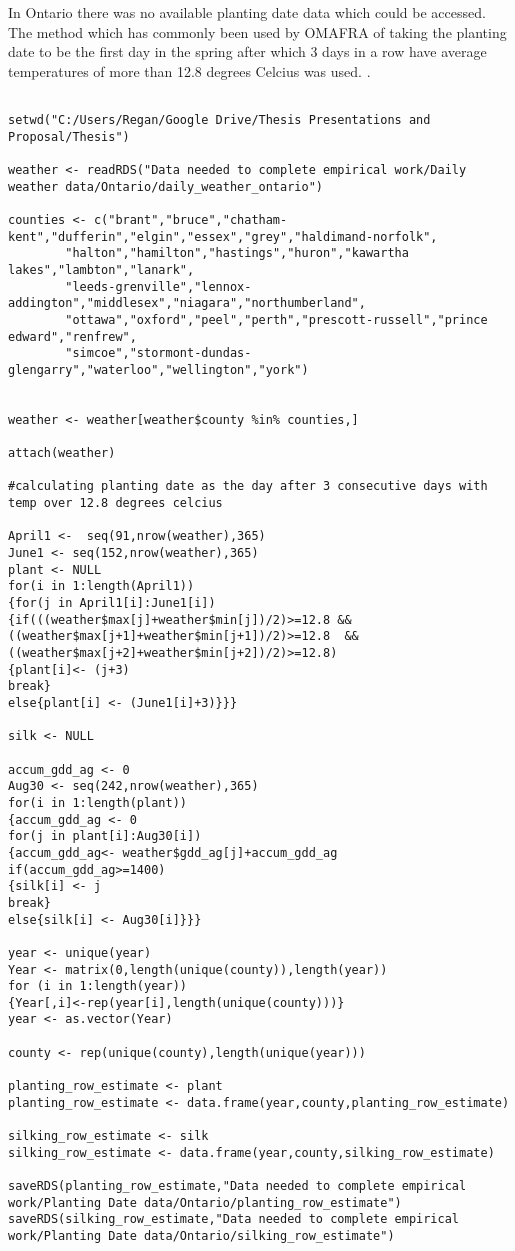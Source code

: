 In Ontario there was no available planting date data which could be accessed. The method which has commonly been used by OMAFRA of taking the planting date to be the first day in the spring after which 3 days in a row have average temperatures of more than 12.8 degrees Celcius was used. \citep{OMAFRAhybrid}.

\begin{lstlisting}

setwd("C:/Users/Regan/Google Drive/Thesis Presentations and Proposal/Thesis")

weather <- readRDS("Data needed to complete empirical work/Daily weather data/Ontario/daily_weather_ontario")

counties <- c("brant","bruce","chatham-kent","dufferin","elgin","essex","grey","haldimand-norfolk",
		"halton","hamilton","hastings","huron","kawartha lakes","lambton","lanark",
		"leeds-grenville","lennox-addington","middlesex","niagara","northumberland",
		"ottawa","oxford","peel","perth","prescott-russell","prince edward","renfrew",
		"simcoe","stormont-dundas-glengarry","waterloo","wellington","york")


weather <- weather[weather$county %in% counties,]

attach(weather)

#calculating planting date as the day after 3 consecutive days with temp over 12.8 degrees celcius

April1 <-  seq(91,nrow(weather),365)
June1 <- seq(152,nrow(weather),365)
plant <- NULL
for(i in 1:length(April1))
{for(j in April1[i]:June1[i])
{if(((weather$max[j]+weather$min[j])/2)>=12.8 && ((weather$max[j+1]+weather$min[j+1])/2)>=12.8  && ((weather$max[j+2]+weather$min[j+2])/2)>=12.8)
{plant[i]<- (j+3)
break}
else{plant[i] <- (June1[i]+3)}}}

silk <- NULL

accum_gdd_ag <- 0
Aug30 <- seq(242,nrow(weather),365)
for(i in 1:length(plant))
{accum_gdd_ag <- 0
for(j in plant[i]:Aug30[i])
{accum_gdd_ag<- weather$gdd_ag[j]+accum_gdd_ag
if(accum_gdd_ag>=1400)
{silk[i] <- j
break}
else{silk[i] <- Aug30[i]}}}

year <- unique(year)
Year <- matrix(0,length(unique(county)),length(year))
for (i in 1:length(year))
{Year[,i]<-rep(year[i],length(unique(county)))}
year <- as.vector(Year)

county <- rep(unique(county),length(unique(year)))

planting_row_estimate <- plant
planting_row_estimate <- data.frame(year,county,planting_row_estimate)

silking_row_estimate <- silk
silking_row_estimate <- data.frame(year,county,silking_row_estimate)

saveRDS(planting_row_estimate,"Data needed to complete empirical work/Planting Date data/Ontario/planting_row_estimate")
saveRDS(silking_row_estimate,"Data needed to complete empirical work/Planting Date data/Ontario/silking_row_estimate")

\end{lstlisting}

